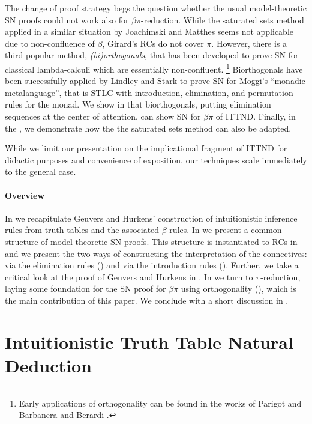\documentclass[a4paper,USenglish,cleveref, autoref, thm-restate]{lipics-v2021}
\begin{document}
The change of proof strategy begs the question whether the usual
model-theoretic SN proofs could not work also for
$\beta\pi$-reduction.  While the saturated sets method applied in
a similar situation by Joachimski and Matthes
\cite{joachimskiMatthes:rta00} seems not applicable due to non-confluence of $\beta$,
Girard's RCs do not cover $\pi$.  However, there is a third popular
method, \emph{(bi)orthogonals}, that has been developed to prove SN
for classical lambda-calculi which are essentially non-confluent.
\footnote{Early applications of orthogonality can be found in the
  works of Parigot \cite{parigot:jsl97,parigot:lamsym} and Barbanera
  and Berardi \cite{barbanera:lamsym}.}
Biorthogonals have been successfully applied by
Lindley and Stark \cite{lindleyStark:tlca05} to prove SN for Moggi's
``monadic metalanguage'', that is STLC with introduction, elimination,
and permutation rules for the monad.  We show in  that
biorthogonals, putting elimination sequences at the center of
attention, can show SN for $\beta\pi$ of ITTND.
Finally, in the , we demonstrate how the the saturated sets
method can also be adapted.

While we limit our presentation on the implicational fragment of ITTND
for didactic purposes and convenience of exposition, our techniques
scale immediately to the general case.

\paragraph*{Overview}
%
In  we recapitulate Geuvers and Hurkens' construction of
intuitionistic inference rules from truth tables and the associated
$\beta$-rules.
%
In  we present a common structure of model-theoretic
SN proofs.
%
This structure is instantiated to RCs in  and we present
the two ways of constructing the interpretation of the connectives:
via the elimination rules () and via the
introduction rules ().  Further, we take a
critical look at the proof of Geuvers and Hurkens
\cite{geuversHurkens:types17} in .
%
In  we turn to $\pi$-reduction, laying some foundation
for the SN proof for $\beta\pi$ using orthogonality
(), which is the main contribution of this paper.
%
We conclude with a short discussion in .


\section{Intuitionistic Truth Table Natural Deduction}
\label{sec:nd}
\end{document}
